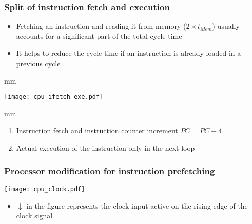 \documentclass{beamer}
\begin{document}
\begin{frame}
\frametitle{Split of instruction fetch and execution}

\begin{itemize}
 \item Fetching an instruction and reading it from memory ($2 \times t_{Mem}$) usually accounts for a significant part of the total cycle time
 \item It helps to reduce the cycle time if an instruction is already loaded in a previous cycle
\end{itemize}

 mm

{
\centering
\texttt{[image: cpu\_ifetch\_exe.pdf]}
}

 mm

\begin{enumerate}
 \item Instruction fetch and instruction counter increment $PC = PC + 4$
 \item Actual execution of the instruction only in the next loop
\end{enumerate}

\end{frame}

\begin{frame}
\frametitle{Processor modification for instruction prefetching}
\texttt{[image: cpu\_clock.pdf]}
\begin{itemize}
 \item $\downarrow$ in the figure represents the clock input active on the rising edge of the clock signal
\end{itemize}

\end{frame}
\end{document}
